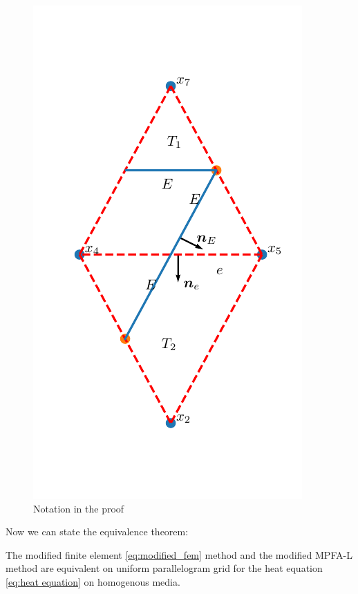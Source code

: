 \documentclass[../Main/main.tex]{subfiles}
\begin{document}
	\begin{figure}[H]\label{fig:two triangles}
		\centering
		\includegraphics{two triangles.pdf}
		\caption{Notation in the proof}
	\end{figure}
	Now we can state the equivalence theorem:
	\begin{theorem}
		The modified finite element \eqref{eq:modified_fem} method and the modified MPFA-L method are equivalent on uniform parallelogram grid for the heat equation \eqref{eq:heat equation} on homogenous media. 
	\end{theorem}
\end{document}

